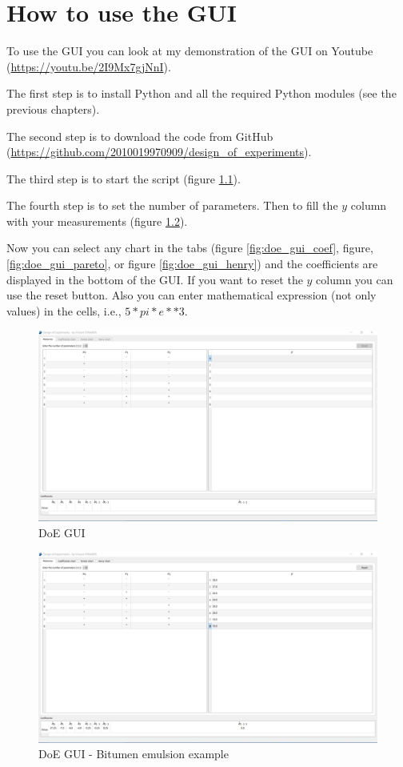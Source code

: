 \documentclass[english, 12 pt, openany, oneside]{book}
\begin{document}
\chapter{How to use the GUI}
To use the GUI you can look at my demonstration of the GUI on Youtube (\url{https://youtu.be/2I9Mx7gjNnI}).

The first step is to install Python and all the required Python modules (see the previous chapters).

The second step is to download the code from GitHub (\url{https://github.com/2010019970909/design_of_experiments}).

The third step is to start the  script (figure \ref{fig:doe_gui}).

The fourth step is to set the number of parameters. Then to fill the $y$ column with your measurements (figure \ref{fig:doe_gui_filled}).

Now you can select any chart in the tabs (figure \ref{fig:doe_gui_coef}, figure, \ref{fig:doe_gui_pareto}, or figure \ref{fig:doe_gui_henry}) and the coefficients are displayed in the bottom of the GUI. If you want to reset the $y$ column you can use the reset button. Also you can enter mathematical expression (not only values) in the cells, i.e., $5*pi*e**3$.

\begin{figure}[!ht]
\centering
\includegraphics[width=\linewidth]{doe_gui}
\caption{DoE GUI\label{fig:doe_gui}}
\end{figure}

\begin{figure}[!ht]
\centering
\includegraphics[width=\linewidth]{doe_gui_filled}
\caption{DoE GUI - Bitumen emulsion example\label{fig:doe_gui_filled}}
\end{figure}
\end{document}
